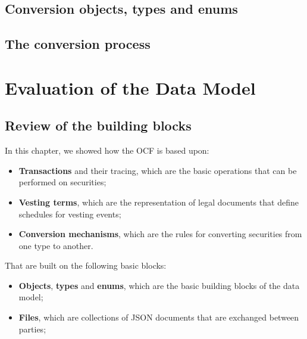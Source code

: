 \noindent{}

\subsection{Conversion objects, types and enums}

\noindent{}

\subsection{The conversion process}



\section{Evaluation of the Data Model}

\subsection{Review of the building blocks}

In this chapter, we showed how the OCF is based upon:

\begin{itemize}
	\item \textbf{Transactions} and their tracing, which are the basic operations that can be performed on securities;
	\item \textbf{Vesting terms}, which are the representation of legal documents that define schedules for vesting events;
	\item \textbf{Conversion mechanisms}, which are the rules for converting securities from one type to another.
\end{itemize}

That are built on the following basic blocks:

\begin{itemize}
	\item \textbf{Objects}, \textbf{types} and \textbf{enums}, which are the basic building blocks of the data model;
	\item \textbf{Files}, which are collections of JSON documents that are exchanged between parties;
\end{itemize}

